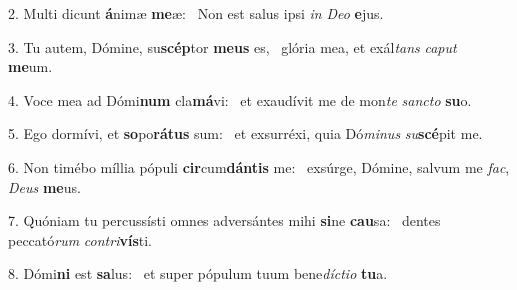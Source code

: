 2. Multi dicunt \textbf{á}nimæ \textbf{me}æ: \ast\  Non est salus ipsi \textit{in} \textit{De}\textit{o} \textbf{e}jus.\

3. Tu autem, Dómine, su\textbf{scép}tor \textbf{me}\textbf{us} es, \ast\  glória mea, et exál\textit{tans} \textit{ca}\textit{put} \textbf{me}um.\

4. Voce mea ad Dómi\textbf{num} cla\textbf{má}vi: \ast\  et exaudívit me de mon\textit{te} \textit{sanc}\textit{to} \textbf{su}o.\

5. Ego dormívi, et \textbf{so}po\textbf{rá}\textbf{tus} sum: \ast\  et exsurréxi, quia Dó\textit{mi}\textit{nus} \textit{su}\textbf{scé}pit me.\

6. Non timébo míllia pópuli \textbf{cir}cum\textbf{dán}\textbf{tis} me: \ast\  exsúrge, Dómine, salvum me \textit{fac}, \textit{De}\textit{us} \textbf{me}us.\

7. Quóniam tu percussísti omnes adversántes mihi \textbf{si}ne \textbf{cau}sa: \ast\  dentes peccató\textit{rum} \textit{con}\textit{tri}\textbf{vís}ti.\

8. Dómi\textbf{ni} est \textbf{sa}lus: \ast\  et super pópulum tuum bene\textit{díc}\textit{ti}\textit{o} \textbf{tu}a.\

